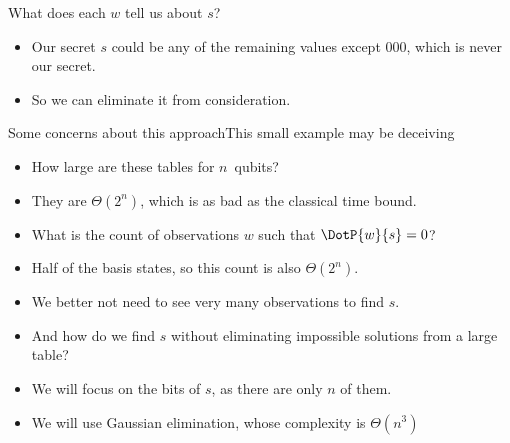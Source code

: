 {\begin{frame}{What does each $w$ tell us about $s$?}
{{\begin{itemize}
\begin{itemize}
    \end{itemize}
    \item<8-> Our secret $s$ could be any of the remaining values except $000$, which is never our secret.
    \item<9-> So we can eliminate it from consideration.
\end{itemize}}%
}%
\end{frame}
}
\begin{frame}{Some concerns about this approach}{This small example may be deceiving}

\begin{itemize}[<+->]
    \item How large are these tables for $n$~qubits?
    \item They are $\Theta(2^n)$, which is as bad as the classical time bound.
    \item What is the count of observations $w$ such that $\DotP{w}{s}=0$?
    \item Half of the basis states, so this count is also $\Theta(2^n)$.   
    \item We better not need to see very many observations to find $s$.
    \item And how do we find $s$ without eliminating impossible solutions from a large table?
    \item We will focus on the bits of $s$, as there are only $n$ of them.
    \item We will use Gaussian elimination, whose complexity is $\Theta(n^{3})$
\end{itemize}
    
\end{frame}

